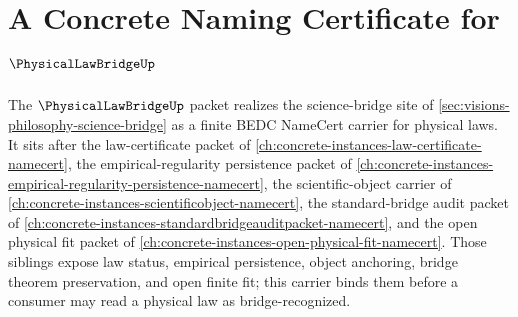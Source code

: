 \chapter{A Concrete Naming Certificate for $\PhysicalLawBridgeUp$}
\label{ch:concrete-instances-physicallawbridge-namecert}

The $\PhysicalLawBridgeUp$ packet realizes the science-bridge site of \autoref{sec:visions-philosophy-science-bridge} as a finite BEDC NameCert carrier for physical laws. It sits after the law-certificate packet of \autoref{ch:concrete-instances-law-certificate-namecert}, the empirical-regularity persistence packet of \autoref{ch:concrete-instances-empirical-regularity-persistence-namecert}, the scientific-object carrier of \autoref{ch:concrete-instances-scientificobject-namecert}, the standard-bridge audit packet of \autoref{ch:concrete-instances-standardbridgeauditpacket-namecert}, and the open physical fit packet of \autoref{ch:concrete-instances-open-physical-fit-namecert}. Those siblings expose law status, empirical persistence, object anchoring, bridge theorem preservation, and open finite fit; this carrier binds them before a consumer may read a physical law as bridge-recognized.

